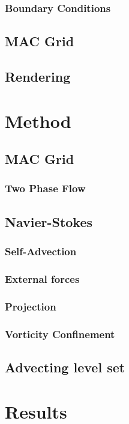 \documentclass[]{report}   %
\begin{document}
\subsection{Boundary Conditions}

\section{MAC Grid}

\section{Rendering}


\chapter{Method}
\section{MAC Grid}

\subsection{Two Phase Flow}

\section{Navier-Stokes}
\subsection{Self-Advection}

\subsection{External forces}

\subsection{Projection}

\subsection{Vorticity Confinement}

\section{Advecting level set}


\chapter{Results}



\endgroup



\end{document}
